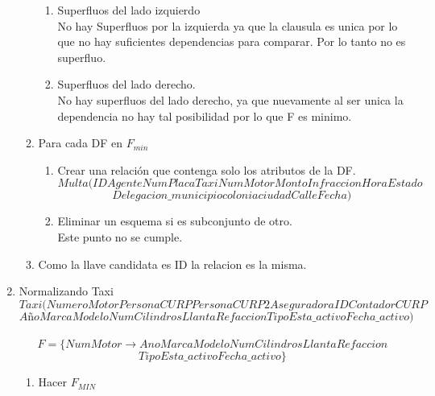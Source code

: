 \documentclass{article}
\begin{document}
\begin{enumerate}
\begin{enumerate}
				\begin{enumerate}
					\item Superfluos del lado izquierdo\\
					No hay Superfluos por la izquierda ya que la clausula es unica por lo que no hay suficientes dependencias para comparar.
					Por lo tanto no es superfluo.\\
					\item Superfluos del lado derecho.\\
					No hay superfluos del lado derecho, ya que nuevamente al ser unica la dependencia no hay tal posibilidad por lo que F es minimo.
				\end{enumerate}
				\item Para cada DF en $F_{min}$
				\begin{enumerate}
					\item Crear una relación que contenga solo los atributos de la DF.
					$$Multa(ID AgenteNumPlaca TaxiNumMotor Monto Infraccion Hora Estado $$
					$$Delegacion\_ municipio 
					colonia ciudad Calle Fecha)$$
					\item Eliminar un esquema si es subconjunto de otro.\\
					Este punto no se cumple.
				\end{enumerate}						
				\item Como la llave candidata es ID la relacion es la misma.
			\end{enumerate}
			
			\item  Normalizando Taxi\\
			$$Taxi(NumeroMotor PersonaCURP PersonaCURP2 AseguradoraID ContadorCURP $$$$Año Marca Modelo NumCilindros LlantaRefaccion Tipo Esta\_ activo Fecha\_ activo)$$\\
			$$F=\{NumMotor\rightarrow Ano Marca Modelo NumCilindros LlantaRefaccion$$$$
			Tipo Esta\_ activoFecha\_ activo\}$$		
			\begin{enumerate}
				\item Hacer $F_{MIN}$\\
				

\end{enumerate}
\end{enumerate}
\end{document}
